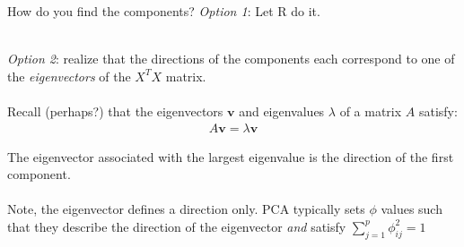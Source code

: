 \documentclass[mathserif]{beamer}
\begin{document}
\begin{frame}{How do you find the components?}
\textit{Option 1}: Let R do it.\\~\\

\pause

\textit{Option 2}: realize that the directions of the components each correspond to one of the \textit{eigenvectors} of the $X^TX$ matrix.  \\~\\

Recall (perhaps?) that the eigenvectors $\mathbf{v}$ and eigenvalues $\lambda$ of a matrix $A$ satisfy:
\begin{align*}
A\mathbf{v} = \lambda \mathbf{v}
\end{align*}

The eigenvector associated with the largest eigenvalue is the direction of the first component.  \\~\\

Note, the eigenvector defines a direction only.  PCA typically sets $\phi$ values such that they describe the direction of the eigenvector \textit{and} satisfy $\sum_{j=1}^p \phi_{ij}^2 = 1$

\end{frame}
\end{document}
